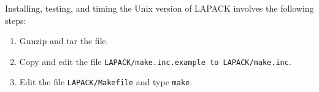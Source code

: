 \documentclass[11pt]{report}
\begin{document}
Installing, testing, and timing the Unix version of LAPACK
involves the following steps: 
\begin{enumerate}
\item Gunzip and tar the file.

\item Copy and edit the file \texttt{LAPACK/make.inc.example to LAPACK/make.inc}.
 
\item Edit the file \texttt{LAPACK/Makefile} and type \texttt{make}.

%
%
%
%
%

\end{enumerate}
\end{document}
